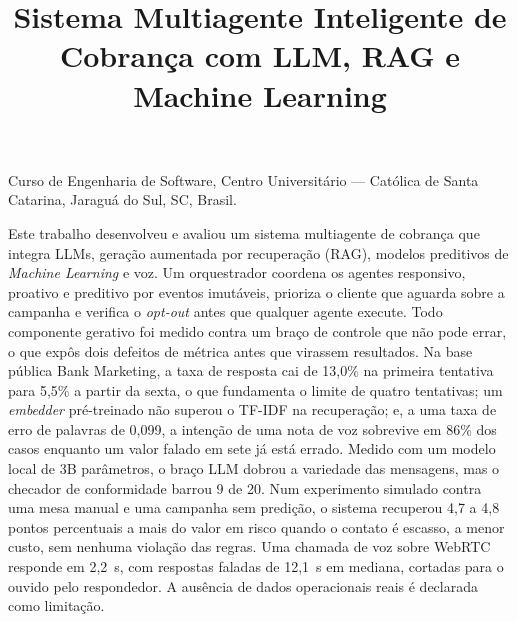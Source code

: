 \documentclass[portuguese]{sbcreviews-2025}%
\title[Sistema Multiagente Inteligente de Cobrança]{Sistema Multiagente Inteligente de Cobrança com LLM, RAG e Machine Learning}
\author[Rocha 2026]{
\affil{\textbf{Gabriel Forster Rocha}~\textcolor{blue}{\faEnvelope}~~[{Centro Universitário Católica de Santa Catarina}~|\href{mailto:gabriel04.rocha@catolicasc.edu.br}{~{\textit{gabriel04.rocha@catolicasc.edu.br}}}~]}
}
\begin{document}
\begin{frontmatter}

\maketitle

\begin{mail}
Curso de Engenharia de Software, Centro Universitário --- Católica de Santa Catarina, Jaraguá do Sul, SC, Brasil.
\end{mail}


\begin{abstract-pt}
Este trabalho desenvolveu e avaliou um sistema multiagente de cobrança que integra LLMs, geração aumentada por recuperação (RAG), modelos preditivos de \textit{Machine Learning} e voz. Um orquestrador coordena os agentes responsivo, proativo e preditivo por eventos imutáveis, prioriza o cliente que aguarda sobre a campanha e verifica o \textit{opt-out} antes que qualquer agente execute. Todo componente gerativo foi medido contra um braço de controle que não pode errar, o que expôs dois defeitos de métrica antes que virassem resultados. Na base pública Bank Marketing, a taxa de resposta cai de 13,0\% na primeira tentativa para 5,5\% a partir da sexta, o que fundamenta o limite de quatro tentativas; um \textit{embedder} pré-treinado não superou o TF-IDF na recuperação; e, a uma taxa de erro de palavras de 0,099, a intenção de uma nota de voz sobrevive em 86\% dos casos enquanto um valor falado em sete já está errado. Medido com um modelo local de 3B parâmetros, o braço LLM dobrou a variedade das mensagens, mas o checador de conformidade barrou 9 de 20. Num experimento simulado contra uma mesa manual e uma campanha sem predição, o sistema recuperou 4,7 a 4,8 pontos percentuais a mais do valor em risco quando o contato é escasso, a menor custo, sem nenhuma violação das regras. Uma chamada de voz sobre WebRTC responde em 2,2~s, com respostas faladas de 12,1~s em mediana, cortadas para o ouvido pelo respondedor. A ausência de dados operacionais reais é declarada como limitação.
\end{abstract-pt}


\end{frontmatter}
\end{document}
